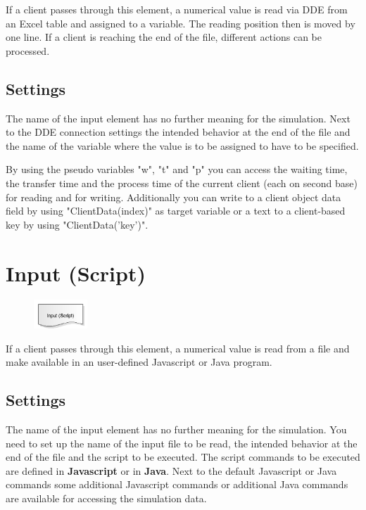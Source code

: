 If a client passes through this element, a numerical value is read via DDE from an
Excel table and assigned to a variable. The reading position then is moved by one line.
If a client is reaching the end of the file, different actions can be processed.

\subsection*{Settings}

The name of the input element has no further meaning for the simulation.
Next to the DDE connection settings the intended behavior at the end of the file and the name of the variable
where the value is to be assigned to have to be specified.

By using the pseudo variables "w", "t" and "p" you can access the waiting time, the transfer time and the
process time of the current client (each on second base) for reading and for writing. Additionally you can
write to a client object data field by using "ClientData(index)" as target variable or a text to a client-based
key by using "ClientData('key')".


\section{Input (Script)}
\label{ref:ModelElementInputJS}

\begin{figure}
\vspace{-22pt}
\includegraphics[width=2cm]{imageModelElementInputJS.png}
\vspace{-22pt}
\end{figure}

If a client passes through this element, a numerical value is read from a file
and make available in an user-defined Javascript or Java program.

\subsection*{Settings}

The name of the input element has no further meaning for the simulation.
You need to set up the name of the input file to be read, the intended behavior
at the end of the file and the script to be executed.
The script commands to be executed are defined in \textbf{Javascript} or in \textbf{Java}.
Next to the default Javascript or Java commands some 
additional Javascript commands or
additional Java commands 
are available for accessing the simulation data.

